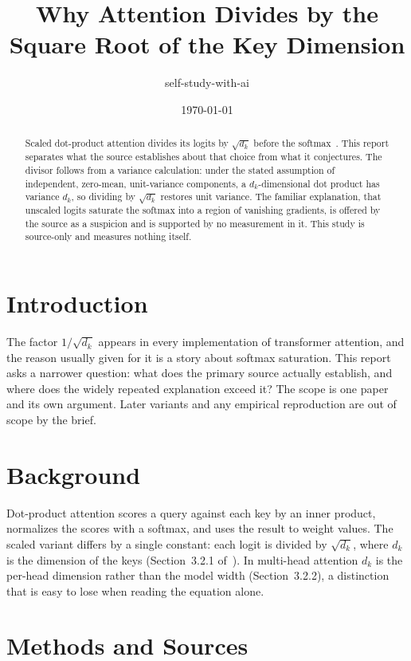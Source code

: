 \documentclass[11pt]{article}
\title{Why Attention Divides by the Square Root of the Key Dimension}
\author{self-study-with-ai}
\date{\today}
\begin{document}
\maketitle

\begin{abstract}
Scaled dot-product attention divides its logits by $\sqrt{d_k}$ before the
softmax~\citep{vaswani2017attention}. This report separates what the source
establishes about that choice from what it conjectures. The divisor follows
from a variance calculation: under the stated assumption of independent,
zero-mean, unit-variance components, a $d_k$-dimensional dot product has
variance $d_k$, so dividing by $\sqrt{d_k}$ restores unit variance. The
familiar explanation, that unscaled logits saturate the softmax into a region
of vanishing gradients, is offered by the source as a suspicion and is
supported by no measurement in it. This study is source-only and measures
nothing itself.
\end{abstract}

\section{Introduction}

The factor $1/\sqrt{d_k}$ appears in every implementation of transformer
attention, and the reason usually given for it is a story about softmax
saturation. This report asks a narrower question: what does the primary
source actually establish, and where does the widely repeated explanation
exceed it? The scope is one paper~\citep{vaswani2017attention} and its own
argument. Later variants and any empirical reproduction are out of scope by
the brief.

\section{Background}

Dot-product attention scores a query against each key by an inner product,
normalizes the scores with a softmax, and uses the result to weight
values. The scaled variant differs by a single constant: each logit is
divided by $\sqrt{d_k}$, where $d_k$ is the dimension of the keys
(Section~3.2.1 of~\citet{vaswani2017attention}). In multi-head attention
$d_k$ is the per-head dimension rather than the model width (Section~3.2.2),
a distinction that is easy to lose when reading the equation alone.

\section{Methods and Sources}
\end{document}
